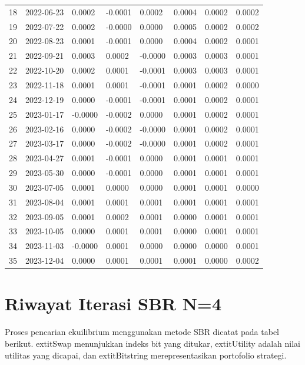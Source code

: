 {\begin{longtable}{llllllll}
18 & 2022-06-23 & 0.0002 & -0.0001 & 0.0002 & 0.0004 & 0.0002 & 0.0002 \\
19 & 2022-07-22 & 0.0002 & -0.0000 & 0.0000 & 0.0005 & 0.0002 & 0.0002 \\
20 & 2022-08-23 & 0.0001 & -0.0001 & 0.0000 & 0.0004 & 0.0002 & 0.0001 \\
21 & 2022-09-21 & 0.0003 & 0.0002 & -0.0000 & 0.0003 & 0.0003 & 0.0001 \\
22 & 2022-10-20 & 0.0002 & 0.0001 & -0.0001 & 0.0003 & 0.0003 & 0.0001 \\
23 & 2022-11-18 & 0.0001 & 0.0001 & -0.0001 & 0.0001 & 0.0002 & 0.0000 \\
24 & 2022-12-19 & 0.0000 & -0.0001 & -0.0001 & 0.0001 & 0.0002 & 0.0001 \\
25 & 2023-01-17 & -0.0000 & -0.0002 & 0.0000 & 0.0001 & 0.0002 & 0.0001 \\
26 & 2023-02-16 & 0.0000 & -0.0002 & -0.0000 & 0.0001 & 0.0002 & 0.0001 \\
27 & 2023-03-17 & 0.0000 & -0.0002 & -0.0000 & 0.0001 & 0.0002 & 0.0001 \\
28 & 2023-04-27 & 0.0001 & -0.0001 & 0.0000 & 0.0001 & 0.0001 & 0.0001 \\
29 & 2023-05-30 & 0.0000 & -0.0001 & 0.0000 & 0.0001 & 0.0001 & 0.0001 \\
30 & 2023-07-05 & 0.0001 & 0.0000 & 0.0000 & 0.0001 & 0.0001 & 0.0000 \\
31 & 2023-08-04 & 0.0001 & 0.0001 & 0.0001 & 0.0001 & 0.0001 & 0.0001 \\
32 & 2023-09-05 & 0.0001 & 0.0002 & 0.0001 & 0.0000 & 0.0001 & 0.0001 \\
33 & 2023-10-05 & 0.0000 & 0.0001 & 0.0001 & 0.0000 & 0.0001 & 0.0001 \\
34 & 2023-11-03 & -0.0000 & 0.0001 & 0.0000 & 0.0000 & 0.0000 & 0.0001 \\
35 & 2023-12-04 & 0.0000 & 0.0001 & 0.0001 & 0.0001 & 0.0000 & 0.0002 \\
\end{longtable}
}

\section{Riwayat Iterasi SBR N=4}

Proses pencarian ekuilibrium menggunakan metode SBR dicatat pada tabel berikut. 	extit{Swap} menunjukkan indeks bit yang ditukar, 	extit{Utility} adalah nilai utilitas yang dicapai, dan 	extit{Bitstring} merepresentasikan portofolio strategi.

